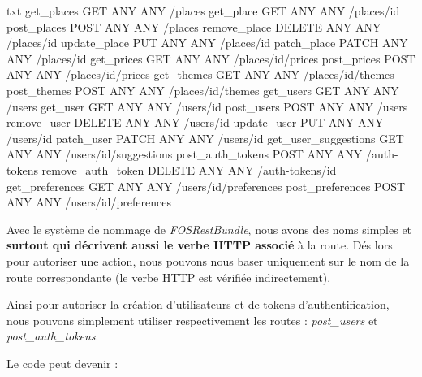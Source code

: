 \documentclass[big]{zmdocument}
\begin{document}
\begin{CodeBlock}{txt}
 get_places                 GET      ANY      ANY    /places
 get_place                  GET      ANY      ANY    /places/{id}
 post_places                POST     ANY      ANY    /places
 remove_place               DELETE   ANY      ANY    /places/{id}
 update_place               PUT      ANY      ANY    /places/{id}
 patch_place                PATCH    ANY      ANY    /places/{id}
 get_prices                 GET      ANY      ANY    /places/{id}/prices
 post_prices                POST     ANY      ANY    /places/{id}/prices
 get_themes                 GET      ANY      ANY    /places/{id}/themes
 post_themes                POST     ANY      ANY    /places/{id}/themes
 get_users                  GET      ANY      ANY    /users
 get_user                   GET      ANY      ANY    /users/{id}
 post_users                 POST     ANY      ANY    /users
 remove_user                DELETE   ANY      ANY    /users/{id}
 update_user                PUT      ANY      ANY    /users/{id}
 patch_user                 PATCH    ANY      ANY    /users/{id}
 get_user_suggestions       GET      ANY      ANY    /users/{id}/suggestions
 post_auth_tokens           POST     ANY      ANY    /auth-tokens
 remove_auth_token          DELETE   ANY      ANY    /auth-tokens/{id}
 get_preferences            GET      ANY      ANY    /users/{id}/preferences
 post_preferences           POST     ANY      ANY    /users/{id}/preferences
\end{CodeBlock}



Avec le système de nommage de \textit{FOSRestBundle}, nous avons des noms simples et \textbf{surtout qui décrivent aussi le verbe HTTP associé} à la route. Dés lors pour autoriser une action, nous pouvons nous baser uniquement sur le nom de la route correspondante (le verbe HTTP est vérifiée indirectement).



Ainsi pour autoriser la création d'utilisateurs et de tokens d'authentification, nous pouvons simplement utiliser respectivement les routes : \textit{post\_users} et \textit{post\_auth\_tokens}.



Le code peut devenir :
\end{document}
